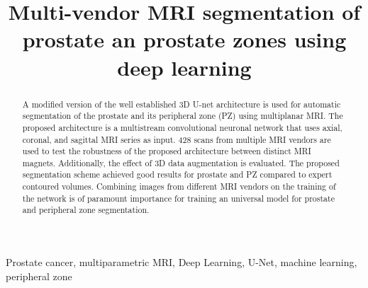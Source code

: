 \documentclass{article}
\title{Multi-vendor MRI segmentation 
of prostate an prostate zones using deep learning}
\begin{document}
\maketitle

\begin{abstract}
A modified version of the well established 3D U-net architecture is used
for automatic segmentation of the prostate and its peripheral zone (PZ) using
multiplanar MRI. The proposed architecture is a multistream convolutional
neuronal network that uses axial, coronal, and sagittal MRI series as input. 
428 scans from multiple MRI vendors are used to test the robustness 
of the proposed architecture between distinct MRI magnets. Additionally, the 
effect of 3D data augmentation  is evaluated.
The proposed segmentation scheme achieved good results for prostate and PZ compared to expert contoured volumes. Combining images from different MRI vendors on the training of the network is of paramount importance for training an universal model for
prostate and peripheral zone segmentation. 
\end{abstract}

\begin{keywords}
Prostate cancer, multiparametric MRI, Deep Learning, U-Net, 
machine learning, peripheral zone
\end{keywords}








\end{document}
